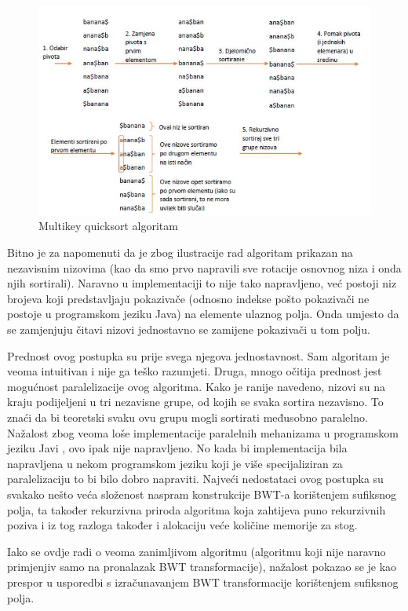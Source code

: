 \begin{figure}[h]
   \centering
       \includegraphics[width=\textwidth]{./pictures/MKQS.jpg}
 \caption{Multikey quicksort algoritam}
 \label{fig:Test}
\end{figure}

Bitno je za napomenuti da je zbog ilustracije rad algoritam prikazan na nezavisnim nizovima (kao da smo prvo napravili sve rotacije osnovnog niza i onda njih sortirali). Naravno u implementaciji to nije tako napravljeno, već postoji niz brojeva koji predstavljaju pokazivače (odnosno indekse pošto pokazivači ne postoje u programskom jeziku Java) na elemente ulaznog polja. Onda umjesto da se zamjenjuju čitavi nizovi jednostavno se zamijene pokazivači u tom polju.

Prednost ovog postupka su prije svega njegova jednostavnost. Sam algoritam je veoma intuitivan i nije ga teško razumjeti. Druga, mnogo očitija prednost jest mogućnost paralelizacije ovog algoritma. Kako je ranije navedeno, nizovi su na kraju podijeljeni u tri nezavisne grupe, od kojih se svaka sortira nezavisno. To znaći da bi teoretski svaku ovu grupu mogli sortirati međusobno paralelno. Nažalost zbog veoma loše implementacije paralelnih mehanizama u programskom jeziku Javi , ovo ipak nije napravljeno. No kada bi implementacija bila napravljena u nekom programskom jeziku koji je više specijaliziran za paralelizaciju to bi bilo dobro napraviti. Najveći nedostataci ovog postupka su svakako nešto veća složenost naspram konstrukcije BWT-a korištenjem sufiksnog polja, ta također rekurzivna priroda algoritma koja zahtijeva puno rekurzivnih poziva i iz tog razloga također i alokaciju veće količine memorije za stog.

Iako se ovdje radi o veoma zanimljivom algoritmu (algoritmu koji nije naravno primjenjiv samo na pronalazak BWT transformacije), nažalost pokazao se je kao prespor u usporedbi s izračunavanjem BWT transformacije korištenjem sufiksnog polja.

